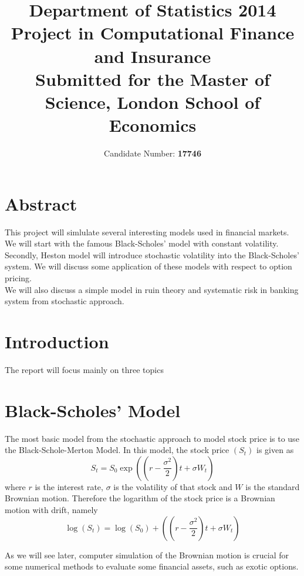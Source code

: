 \documentclass[a4paper, 11pt]{article}
\begin{document}
\title{Department of Statistics 2014\\ {\bf Project in Computational Finance and Insurance}\\ {\small Submitted for the Master of Science, London School of Economics} }
\author{Candidate Number: \bf 17746}
\maketitle
\vfill
\section*{Abstract}
This project will simlulate several interesting models used in financial markets. We will start with the famous Black-Scholes' model with constant volatility. Secondly, Heston model will introduce stochastic volatility into the Black-Scholes' system. We will discuss some application of these models with respect to option pricing.\\

We will also discuss a simple model in ruin theory and systematic risk in banking system from stochastic approach.

\newpage

\tableofcontents
\newpage
\section{Introduction}
The report will focus mainly on three topics 

\section{Black-Scholes' Model}
The most basic model from the stochastic approach to model stock price is to use the Black-Schole-Merton Model. In this model, the stock price $(S_t)$ is given as
$$S_t = S_0 \exp\left( (r - \frac{\sigma^2}{2} )t + \sigma W_t \right)$$
where $r$ is the interest rate, $\sigma$ is the volatility of that stock and $W$ is the standard Brownian motion. Therefore the logarithm of the stock price is a Brownian motion with drift, namely 
$$\log(S_t) = \log(S_0) + ((r - \frac{\sigma^2}{2} )t + \sigma W_t )$$

As we will see later, computer simulation of the Brownian motion is crucial for some numerical methods to evaluate some financial assets, such as exotic options.\\
\end{document}
